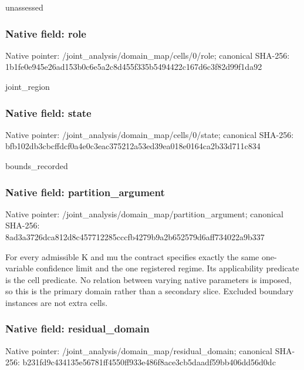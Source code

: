 \documentclass[10pt,a4paper]{article}
\begin{document}
\begingroup\raggedright\sloppy unassessed\par\endgroup

\subsubsection{Native field: role}
Native pointer: /joint\_\allowbreak{}analysis/domain\_\allowbreak{}map/cells/0/role; canonical SHA-256: 1b1fe0e945e26ad153b0c6e5a2c8d455f335b5494422c167d6c3f82d99f1da92

\begingroup\raggedright\sloppy joint\_\allowbreak{}region\par\endgroup

\subsubsection{Native field: state}
Native pointer: /joint\_\allowbreak{}analysis/domain\_\allowbreak{}map/cells/0/state; canonical SHA-256: bfb102db3cbcffdcf0a4e0c3eac375212a53ed39ea018e0164ca2b33d711c834

\begingroup\raggedright\sloppy bounds\_\allowbreak{}recorded\par\endgroup

\subsubsection{Native field: partition\_\allowbreak{}argument}
Native pointer: /joint\_\allowbreak{}analysis/domain\_\allowbreak{}map/partition\_\allowbreak{}argument; canonical SHA-256: 8ad3a3726dca812d8c457712285cccfb4279b9a2b652579d6aff734022a9b337

\begingroup\raggedright\sloppy For every admissible K and mu the contract specifies exactly the same one-variable confidence limit and the one registered regime. Its applicability predicate is the cell predicate. No relation between varying native parameters is imposed,\allowbreak{} so this is the primary domain rather than a secondary slice. Excluded boundary instances are not extra cells.\par\endgroup

\subsubsection{Native field: residual\_\allowbreak{}domain}
Native pointer: /joint\_\allowbreak{}analysis/domain\_\allowbreak{}map/residual\_\allowbreak{}domain; canonical SHA-256: b231fd9c434135e56781ff4550ff933e486f8ace3cb5daadf59bb406dd56d0dc
\end{document}
